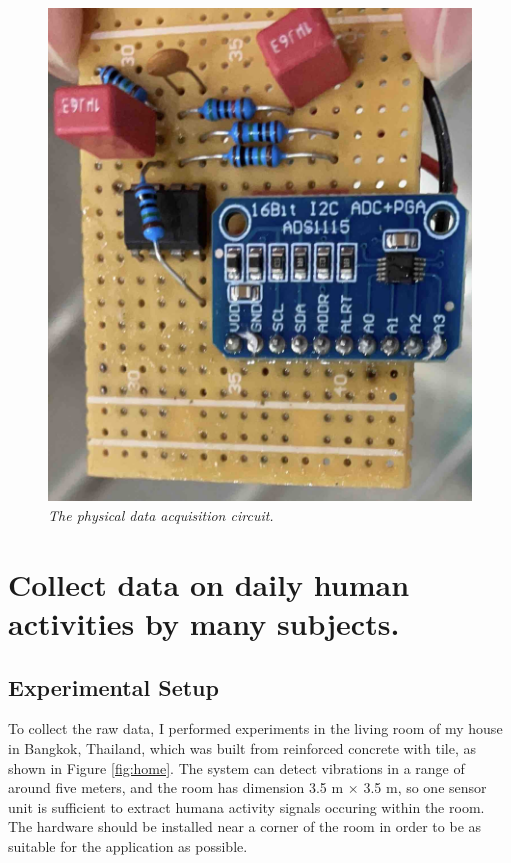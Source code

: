 \begin{figure}[H]
  \centering
  \caption[The physical data acquisition circuit.]{\emph{The physical data acquisition circuit.}}\label{fig:physical_analog_circuit}
  \includegraphics[scale = 0.15]{figures/physical_analog_circuit.jpg}
\end{figure}

\section{Collect data on daily human activities by many subjects.}
\subsection{Experimental Setup}


To collect the raw data, I performed experiments in the living room of my house in Bangkok, Thailand, which was built from reinforced concrete with tile, as shown in Figure \ref{fig:home}. The system can detect vibrations in a range of around five meters, and the room has dimension 3.5 m $\times$ 3.5 m, so one sensor unit is sufficient to extract humana activity signals occuring within the room. The hardware should be installed near a corner of the room in order to be as suitable for the application as possible.

